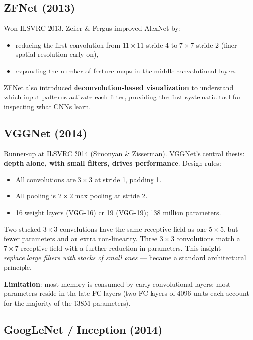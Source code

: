 \documentclass[11pt,a4paper]{article}
\theoremstyle{definition}
\theoremstyle{plain}
\theoremstyle{remark}
\begin{document}
\subsection{ZFNet (2013)}

Won ILSVRC 2013. Zeiler \& Fergus improved AlexNet by:
\begin{itemize}
    \item reducing the first convolution from $11\times11$ stride 4 to $7\times7$ stride 2 (finer spatial resolution early on),
    \item expanding the number of feature maps in the middle convolutional layers.
\end{itemize}
ZFNet also introduced \textbf{deconvolution-based visualization} to understand which input patterns activate each filter, providing the first systematic tool for inspecting what CNNs learn.

\subsection{VGGNet (2014)}

Runner-up at ILSVRC 2014 (Simonyan \& Zisserman). VGGNet's central thesis: \textbf{depth alone, with small filters, drives performance}. Design rules:
\begin{itemize}
    \item All convolutions are $3 \times 3$ at stride 1, padding 1.
    \item All pooling is $2 \times 2$ max pooling at stride 2.
    \item 16 weight layers (VGG-16) or 19 (VGG-19); 138 million parameters.
\end{itemize}

Two stacked $3 \times 3$ convolutions have the same receptive field as one $5 \times 5$, but fewer parameters and an extra non-linearity. Three $3 \times 3$ convolutions match a $7 \times 7$ receptive field with a further reduction in parameters. This insight --- \emph{replace large filters with stacks of small ones} --- became a standard architectural principle.

\textbf{Limitation}: most memory is consumed by early convolutional layers; most parameters reside in the late FC layers (two FC layers of 4096 units each account for the majority of the 138M parameters).

\subsection{GoogLeNet / Inception (2014)}
\end{document}
